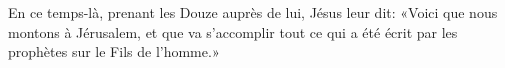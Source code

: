 En ce temps-là, prenant les Douze auprès de lui, Jésus leur dit:
	«Voici que nous montons à Jérusalem,
	et que va s’accomplir tout ce qui a été écrit par les prophètes
		sur le Fils de l’homme.»
